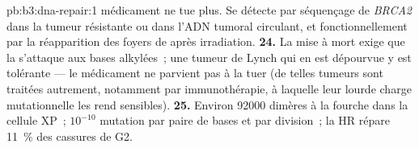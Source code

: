 \begin{solution}{pb:b3:dna-repair:1}
médicament ne tue plus. Se détecte par séquençage de \emph{BRCA2} dans
la tumeur résistante ou dans l'ADN tumoral circulant, et
fonctionnellement par la réapparition des foyers de  après
irradiation.
\textbf{24.} La mise à mort exige que la 
s'attaque aux bases alkylées~; une tumeur de Lynch qui en est dépourvue
y est tolérante --- le médicament ne parvient pas à la tuer (de telles
tumeurs sont traitées autrement, notamment par immunothérapie, à
laquelle leur lourde charge mutationnelle les rend sensibles).
\textbf{25.} Environ \num{92000} dimères à la fourche dans la cellule
XP~; $10^{-10}$ mutation par paire de bases et par division~; la HR
répare \qty{11}{\%} des cassures de G2.
\end{solution}
